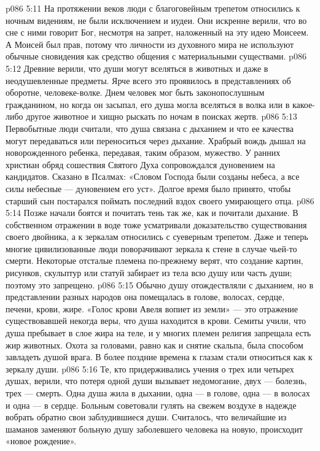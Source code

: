 \vs p086 5:11 На протяжении веков люди с благоговейным трепетом относились к ночным видениям, не были исключением и иудеи. Они искренне верили, что во сне с ними говорит Бог, несмотря на запрет, наложенный на эту идею Моисеем. А Моисей был прав, потому что личности из духовного мира не используют обычные сновидения как средство общения с материальными существами.
\vs p086 5:12 Древние верили, что души могут вселяться в животных и даже в неодушевленные предметы. Ярче всего это проявилось в представлениях об оборотне, человеке\hyp{}волке. Днем человек мог быть законопослушным гражданином, но когда он засыпал, его душа могла вселяться в волка или в какое\hyp{}либо другое животное и хищно рыскать по ночам в поисках жертв.
\vs p086 5:13 Первобытные люди считали, что душа связана с дыханием и что ее качества могут передаваться или переноситься через дыхание. Храбрый вождь дышал на новорожденного ребенка, передавая, таким образом, мужество. У ранних христиан обряд сошествия Святого Духа сопровождался дуновением на кандидатов. Сказано в Псалмах: «Словом Господа были созданы небеса, а все силы небесные --- дуновением его уст». Долгое время было принято, чтобы старший сын постарался поймать последний вздох своего умирающего отца.
\vs p086 5:14 Позже начали боятся и почитать тень так же, как и почитали дыхание. В собственном отражении в воде тоже усматривали доказательство существования своего двойника, а к зеркалам относились с суеверным трепетом. Даже и теперь многие цивилизованные люди поворачивают зеркала к стене в случае чьей\hyp{}то смерти. Некоторые отсталые племена по\hyp{}прежнему верят, что создание картин, рисунков, скульптур или статуй забирает из тела всю душу или часть души; поэтому это запрещено.
\vs p086 5:15 Обычно душу отождествляли с дыханием, но в представлении разных народов она помещалась в голове, волосах, сердце, печени, крови, жире. «Голос крови Авеля вопиет из земли» --- это отражение существовавшей некогда веры, что душа находится в крови. Семиты учили, что душа пребывает в слое жира на теле, и у многих племен религия запрещала есть жир животных. Охота за головами, равно как и снятие скальпа, была способом завладеть душой врага. В более поздние времена к глазам стали относиться как к зеркалу души.
\vs p086 5:16 Те, кто придерживались учения о трех или четырех душах, верили, что потеря одной души вызывает недомогание, двух --- болезнь, трех --- смерть. Одна душа жила в дыхании, одна --- в голове, одна --- в волосах и одна --- в сердце. Больным советовали гулять на свежем воздухе в надежде вобрать обратно свои заблудившиеся души. Считалось, что величайшие из шаманов заменяют больную душу заболевшего человека на новую, происходит «новое рождение».
